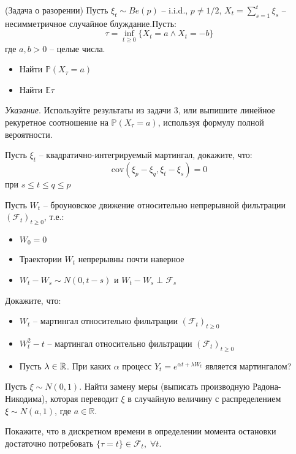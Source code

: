 \documentclass[12pt]{article}
\begin{document}
\begin{problem}(Задача о разорении)
    Пусть $\xi_t \sim Be(p)$ -- i.i.d., $p\neq 1/2$, $X_t = \sum_{s=1}^t \xi_s$ -- несимметричное случайное блуждание.Пусть:
    $$
        \tau = \inf_{t \geq 0} \{ X_t = a \wedge X_t =-b\}
    $$где $a, b > 0$ -- целые числа.

    \begin{itemize}
        \item Найти $\mathbb{P}(X_{\tau} = a)$
        \item Найти $\mathbb{E}\tau$
    \end{itemize}
    \textit{Указание}. Используйте результаты из задачи 3, или выпишите линейное рекуретное соотношение на $\mathbb{P}(X_{\tau} = a)$, используя формулу полной вероятности.
\end{problem}

\begin{problem}
    Пусть $\xi_t$ -- квадратично-интегрируемый мартингал, докажите, что:
    $$
        \mathrm{cov} (\xi_p - \xi_q, \xi_t - \xi_s) = 0
    $$ при $s \leq t \leq q \leq p$
\end{problem}

\begin{problem}
    Пусть $W_t$ -- броуновское движение относительно непрерывной фильтрации $(\mathcal{F}_t)_{t\geq0}$, т.е.:
    \begin{itemize}
        \item $W_0 = 0$
        \item Траектории $W_t$ непрерывны почти наверное
        \item $W_t - W_s \sim N(0, t-s)$ и $W_t - W_s \perp \mathcal{F}_s$
    \end{itemize}

    Докажите, что:
    \begin{itemize}
        \item $W_t$ -- мартингал относительно фильтрации $(\mathcal{F}_t)_{t\geq0}$
        \item $W_t^2 -t$ -- мартингал относительно фильтрации $(\mathcal{F}_t)_{t\geq0}$
        \item Пусть $\lambda \in \mathbb{R}$. При каких $\alpha$ процесс 
        $Y_t = e^{\alpha t + \lambda W_t}$ является мартингалом?
    \end{itemize}
\end{problem}

\begin{problem}
    Пусть $\xi \sim N(0, 1)$. Найти замену меры (выписать производную Радона-Никодима), которая переводит $\xi$ в случайную величину с распределением$\xi \sim N(a, 1)$, где $a \in \mathbb{R}$.
\end{problem}

\begin{problem}
    Покажите, что в дискретном времени в определении момента остановки достаточно потребовать $\{\tau = t\} \in \mathcal{F}_t, \; \forall t$.  
\end{problem}
\end{document}
